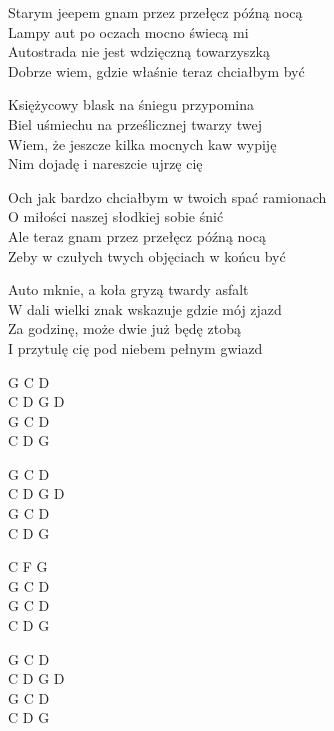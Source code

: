\begin{text}
    Starym jeepem gnam przez przełęcz późną nocą\\
    Lampy aut po oczach mocno świecą mi\\
    Autostrada nie jest wdzięczną towarzyszką\\
    Dobrze wiem, gdzie właśnie teraz chciałbym być

    Księżycowy blask na śniegu przypomina\\
    Biel uśmiechu na prześlicznej twarzy twej\\
    Wiem, że jeszcze kilka mocnych kaw wypiję\\
    Nim dojadę i nareszcie ujrzę cię

    \vin Och jak bardzo chciałbym w twoich spać ramionach\\
    \vin O miłości naszej słodkiej sobie śnić\\
    \vin Ale teraz gnam przez przełęcz późną nocą\\
    \vin Zeby w czułych twych objęciach w końcu być

    Auto mknie, a koła gryzą twardy asfalt\\
    W dali wielki znak wskazuje gdzie mój zjazd\\
    Za godzinę, może dwie już będę ztobą\\
    I przytulę cię pod niebem pełnym gwiazd

\end{text}
\begin{chord}
    G C D\\
    C D G D\\
    G C D\\
    C D G

    G C D\\
    C D G D\\
    G C D\\
    C D G

    C F G\\
    G C D\\
    G C D\\
    C D G

    G C D\\
    C D G D\\
    G C D\\
    C D G
\end{chord}